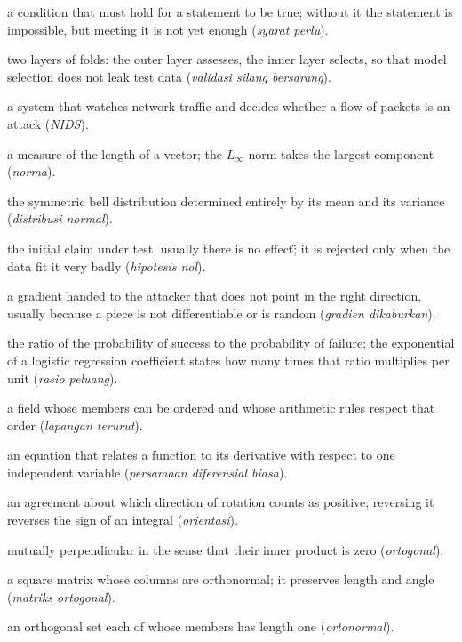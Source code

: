 \begin{description}[style=nextline,itemsep=0.35em]
  \item[Necessary condition] a condition that must hold for a statement to be true; without it the statement is impossible, but meeting it is not yet enough (\emph{syarat perlu}).
  \item[Nested cross-validation] two layers of folds: the outer layer assesses, the inner layer selects, so that model selection does not leak test data (\emph{validasi silang bersarang}).
  \item[Network intrusion detection system] a system that watches network traffic and decides whether a flow of packets is an attack (\emph{NIDS}).
  \item[Norm] a measure of the length of a vector; the $L_\infty$ norm takes the largest component (\emph{norma}).
  \item[Normal distribution] the symmetric bell distribution determined entirely by its mean and its variance (\emph{distribusi normal}).
  \item[Null hypothesis] the initial claim under test, usually \"there is no effect\"; it is rejected only when the data fit it very badly (\emph{hipotesis nol}).
  \item[Obfuscated gradient] a gradient handed to the attacker that does not point in the right direction, usually because a piece is not differentiable or is random (\emph{gradien dikaburkan}).
  \item[Odds ratio] the ratio of the probability of success to the probability of failure; the exponential of a logistic regression coefficient states how many times that ratio multiplies per unit (\emph{rasio peluang}).
  \item[Ordered field] a field whose members can be ordered and whose arithmetic rules respect that order (\emph{lapangan terurut}).
  \item[Ordinary differential equation] an equation that relates a function to its derivative with respect to one independent variable (\emph{persamaan diferensial biasa}).
  \item[Orientation] an agreement about which direction of rotation counts as positive; reversing it reverses the sign of an integral (\emph{orientasi}).
  \item[Orthogonal] mutually perpendicular in the sense that their inner product is zero (\emph{ortogonal}).
  \item[Orthogonal matrix] a square matrix whose columns are orthonormal; it preserves length and angle (\emph{matriks ortogonal}).
  \item[Orthonormal] an orthogonal set each of whose members has length one (\emph{ortonormal}).

\end{description}
